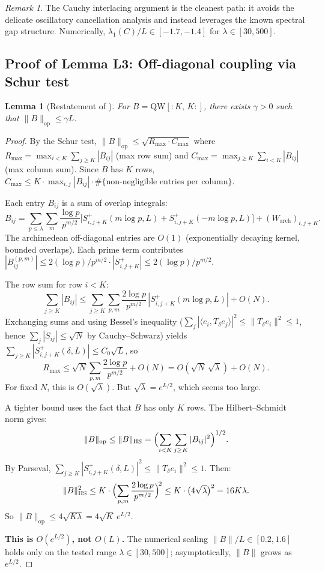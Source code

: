 \documentclass[12pt,a4paper]{article}
\newtheorem{lemma}[theorem]{Lemma}
\theoremstyle{definition}
\theoremstyle{remark}
\newtheorem{remark}[theorem]{Remark}
\begin{document}
\begin{remark}
The Cauchy interlacing argument is the cleanest path: it avoids the delicate oscillatory cancellation analysis and instead leverages the known spectral gap structure. Numerically, $\lambda_1(C)/L \in [-1.7, -1.4]$ for $\lambda \in [30, 500]$.
\end{remark}

\subsection{Proof of Lemma L3: Off-diagonal coupling via Schur test}
\label{sec:L3-proof}

\begin{lemma}[Restatement of ]
For $B = \mathrm{QW}[{:}K,\,K{:}]$, there exists $\gamma > 0$ such that $\|B\|_{\mathrm{op}} \leq \gamma L$.
\end{lemma}

\begin{proof}
By the Schur test, $\|B\|_{\mathrm{op}} \leq \sqrt{R_{\max}\cdot C_{\max}}$ where $R_{\max} = \max_{i < K}\sum_{j \geq K}|B_{ij}|$ (max row sum) and $C_{\max} = \max_{j \geq K}\sum_{i < K}|B_{ij}|$ (max column sum). Since $B$ has $K$ rows, $C_{\max} \leq K \cdot \max_{i,j}|B_{ij}| \cdot \#\{\text{non-negligible entries per column}\}$.

Each entry $B_{ij}$ is a sum of overlap integrals:
\[
  B_{ij} = \sum_{p \leq \lambda}\sum_m \frac{\log p}{p^{m/2}}\bigl[S_{i,j+K}^+(m\log p, L) + S_{i,j+K}^+(-m\log p, L)\bigr] + (W_{\mathrm{arch}})_{i,j+K}.
\]
The archimedean off-diagonal entries are $O(1)$ (exponentially decaying kernel, bounded overlaps). Each prime term contributes
$|B_{ij}^{(p,m)}| \leq 2(\log p)/p^{m/2} \cdot |S_{i,j+K}^+| \leq 2(\log p)/p^{m/2}$.

The row sum for row $i < K$:
\[
  \sum_{j \geq K}|B_{ij}|
  \leq \sum_{j \geq K}\sum_{p,m}\frac{2\log p}{p^{m/2}}\,|S_{i,j+K}^+(m\log p, L)| + O(N).
\]
Exchanging sums and using Bessel's inequality
($\sum_j |\langle e_i, T_\delta e_j\rangle|^2
\leq \|T_\delta e_i\|^2 \leq 1$,
hence $\sum_j |S_{ij}| \leq \sqrt{N}$ by Cauchy--Schwarz)
yields $\sum_{j \geq K} |S_{i,j+K}^+(\delta, L)|
\leq C_0\sqrt{L}$, so
\[
  R_{\max} \leq \sqrt{N}\sum_{p,m}\frac{2\log p}{p^{m/2}} + O(N) = O(\sqrt{N}\,\sqrt{\lambda}) + O(N).
\]
For fixed $N$, this is $O(\sqrt{\lambda})$. But $\sqrt{\lambda} = e^{L/2}$, which seems too large.

A tighter bound uses the fact that $B$ has only $K$ rows. The Hilbert--Schmidt norm gives:
\[
  \|B\|_{\mathrm{op}} \leq \|B\|_{\mathrm{HS}} = \Bigl(\sum_{i < K}\sum_{j \geq K}|B_{ij}|^2\Bigr)^{1/2}.
\]
By Parseval, $\sum_{j \geq K} |S_{i,j+K}^+(\delta,L)|^2 \leq \|T_\delta e_i\|^2 \leq 1$. Then:
\[
  \|B\|_{\mathrm{HS}}^2
  \leq K\cdot\Bigl(\sum_{p,m}\frac{2\log p}{p^{m/2}}\Bigr)^{\!2}
  \leq K\cdot\bigl(4\sqrt{\lambda}\bigr)^2 = 16K\lambda.
\]
So $\|B\|_{\mathrm{op}} \leq 4\sqrt{K\lambda} = 4\sqrt{K}\,e^{L/2}$.

\textbf{This is $O(e^{L/2})$, not $O(L)$.} The numerical scaling $\|B\|/L \in [0.2, 1.6]$ holds only on the tested range $\lambda \in [30, 500]$; asymptotically, $\|B\|$ grows as $e^{L/2}$.
\end{proof}
\end{document}
